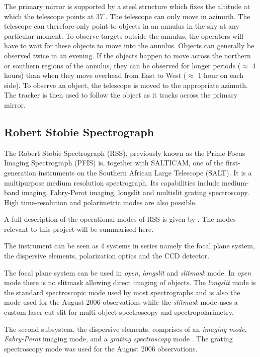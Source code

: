 The primary mirror is supported by a steel structure which fixes the altitude at which the telescope points at  $37^{\circ}$. The telescope can only move in azimuth. The telescope can therefore only point to objects in an annulus in the sky at any particular moment. To observe targets outside the annulus, the operators will have to wait for these objects to move into the annulus. Objects can generally be observed twice in an evening. If the objects happen to move across the northern or southern regions of the annulus, they can be observed for longer periods ($\approx$ 4 hours) than when they move overhead from East to West ($\approx $ 1 hour on each side). To observe an object, the telescope is moved to the appropriate azimuth. The tracker is then used to follow the object as it tracks across the primary mirror.




\subsection{Robert Stobie Spectrograph}
\label{RSS}

The Robert Stobie Spectrograph (RSS), previously known as the Prime Focus Imaging Spectrograph (PFIS) is, together with SALTICAM, one of the first-generation instruments on the Southern African Large Telescope (SALT). It is a multipurpose medium resolution spectrograph. Its capabilities include medium-band imaging, Fabry-Perot imaging, longslit and multislit grating spectroscopy. High time-resolution and polarimetric modes are also possible. \citep{RSS_Modes}

A full description of the operational modes of RSS is given by \cite{RSS_Modes}. The modes relevant to this project will be summarised here.

The instrument can be seen as 4 systems in series namely the focal plane system, the dispersive elements, polarization optics and the CCD detector.

The focal plane system can be used in \textit{open}, \textit{longslit} and \textit{slitmask} mode. In \textit{open} mode there is no slitmask allowing direct imaging of objects. The \textit{longslit} mode is the standard spectroscopic mode used by most spectrographs and is also the mode used for the August 2006 observations while the \textit{slitmask} mode uses a custom laser-cut slit for multi-object spectroscopy and spectropolarimetry. \citep{RSS_Modes}

The second subsystem, the dispersive elements, comprises of an \textit{imaging mode}, \textit{Fabry-Perot} imaging mode, and a \textit{grating spectroscopy} mode \citep{RSS_Modes}. The grating spectroscopy mode was used for the August 2006 observations.

